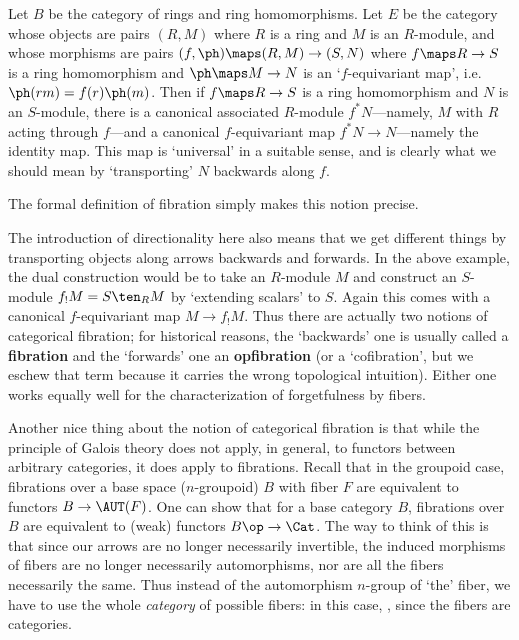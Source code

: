 \documentclass{amsart}
\begin{document}
\begin{eg}
  Let $B$ be the category of rings and ring homomorphisms.  Let $E$ be
  the category whose objects are pairs $(R,M)$ where $R$ is a ring and
  $M$ is an $R$-module, and whose morphisms are pairs $(f,\ph)\maps
  (R,M)\to (S,N)$ where $f\maps R\to S$ is a ring homomorphism and
  $\ph\maps M\to N$ is an `$f$-equivariant map', i.e.\
  $\ph(rm)=f(r)\ph(m)$.  Then if $f\maps R\to S$ is a ring
  homomorphism and $N$ is an $S$-module, there is a canonical
  associated $R$-module $f^*N$---namely, $M$ with $R$ acting through
  $f$---and a canonical $f$-equivariant map $f^*N\to N$---namely the
  identity map.  This map is `universal' in a suitable sense, and is
  clearly what we should mean by `transporting' $N$ backwards along
  $f$.
\end{eg}

The formal definition of fibration simply makes this notion precise.

The introduction of directionality here also means
that we get different things by transporting objects along arrows
backwards and forwards.  In the above example, the dual construction
would be to take an $R$-module $M$ and construct an $S$-module $f_!M =
S\ten_R M$ by `extending scalars' to $S$.  Again this comes with a
canonical $f$-equivariant map $M\to f_! M$.  Thus there are actually
two notions of categorical fibration; for historical reasons, the
`backwards' one is usually called a \textbf{fibration} and the
`forwards' one an \textbf{opfibration} (or a `cofibration', but we
eschew that term because it carries the wrong topological intuition).
Either one works equally well for the characterization of
forgetfulness by fibers.

Another nice thing about the notion of categorical fibration is that
while the principle of Galois theory does not apply, in general, to
functors between arbitrary categories, it does apply to fibrations.
Recall that in the groupoid case, fibrations over a base space
($n$-groupoid) $B$ with fiber $F$ are equivalent to functors $B\to
\AUT(F)$.  One can show that for a base category $B$, fibrations over
$B$ are equivalent to (weak) functors $B\op\to\Cat$.  The way to think
of this is that since our arrows are no longer necessarily invertible,
the induced morphisms of fibers are no longer necessarily
automorphisms, nor are all the fibers necessarily the same.  Thus
instead of the automorphism $n$-group of `the' fiber, we have to use
the whole \emph{category} of possible fibers: in this case, \Cat,
since the fibers are categories.
\end{document}
